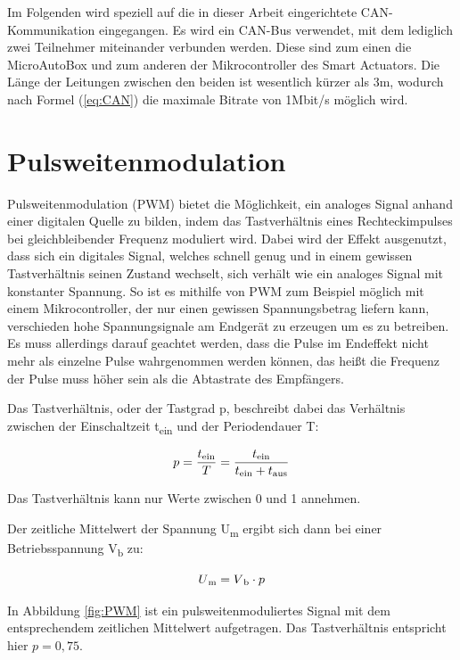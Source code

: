 Im Folgenden wird speziell auf die in dieser Arbeit eingerichtete CAN-Kommunikation eingegangen. Es wird ein CAN-Bus verwendet, mit dem lediglich zwei Teilnehmer miteinander verbunden werden. Diese sind zum einen die MicroAutoBox und zum anderen der Mikrocontroller des Smart Actuators. Die Länge der Leitungen zwischen den beiden ist wesentlich kürzer als 3m, wodurch nach Formel (\ref{eq:CAN}) die maximale Bitrate von 1Mbit/s möglich wird.

\section{Pulsweitenmodulation}
Pulsweitenmodulation (PWM) bietet die Möglichkeit, ein analoges Signal anhand einer digitalen Quelle zu bilden, indem das Tastverhältnis eines Rechteckimpulses bei gleichbleibender Frequenz moduliert wird. Dabei wird der Effekt ausgenutzt, dass sich ein digitales Signal, welches schnell genug und in einem gewissen Tastverhältnis seinen Zustand wechselt, sich verhält wie ein analoges Signal mit konstanter Spannung. So ist es mithilfe von PWM zum Beispiel möglich mit einem Mikrocontroller, der nur einen gewissen Spannungsbetrag liefern kann, verschieden hohe Spannungsignale am Endgerät zu erzeugen um es zu betreiben. Es muss allerdings darauf geachtet werden, dass die Pulse im Endeffekt nicht mehr als einzelne Pulse wahrgenommen werden können, das heißt die Frequenz der Pulse muss höher sein als die Abtastrate des Empfängers.

Das Tastverhältnis, oder der Tastgrad p, beschreibt dabei das Verhältnis zwischen der Einschaltzeit t\textsubscript{ein} und der Periodendauer T:

\begin{equation}
	p=\frac{t\textsubscript{ein}}{T} = \frac{t\textsubscript{ein}}{t\textsubscript{ein}+t\textsubscript{aus}}
\end{equation}

Das Tastverhältnis kann nur Werte zwischen 0 und 1 annehmen.

Der zeitliche Mittelwert der Spannung U\textsubscript{m} ergibt sich dann bei einer Betriebsspannung V\textsubscript{b} zu:

\begin{equation}
	U\textsubscript{m}=V\textsubscript{b}\cdot p
\end{equation}

In Abbildung \ref{fig:PWM} ist ein pulsweitenmoduliertes Signal mit dem entsprechendem zeitlichen Mittelwert aufgetragen. Das Tastverhältnis entspricht hier $p=0,75$.

